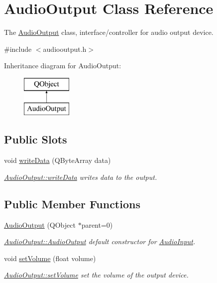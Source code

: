\hypertarget{class_audio_output}{\section{Audio\+Output Class Reference}
\label{class_audio_output}
}


The \hyperlink{class_audio_output}{Audio\+Output} class, interface/controller for audio output device.  




{\ttfamily \#include $<$audiooutput.\+h$>$}

Inheritance diagram for Audio\+Output\+:\begin{figure}[H]
\begin{center}
\leavevmode
\includegraphics[height=2.000000cm]{class_audio_output}
\end{center}
\end{figure}
\subsection*{Public Slots}
\begin{DoxyCompactItemize}
\item 
void \hyperlink{class_audio_output_a7daeee7334313b255eac6b2d31e54729}{write\+Data} (Q\+Byte\+Array data)
\begin{DoxyCompactList}\small\item\em \hyperlink{class_audio_output_a7daeee7334313b255eac6b2d31e54729}{Audio\+Output\+::write\+Data} writes data to the output. \end{DoxyCompactList}\end{DoxyCompactItemize}
\subsection*{Public Member Functions}
\begin{DoxyCompactItemize}
\item 
\hyperlink{class_audio_output_a1536f8f50eb732249ffbcf491b04dee2}{Audio\+Output} (Q\+Object $\ast$parent=0)
\begin{DoxyCompactList}\small\item\em \hyperlink{class_audio_output_a1536f8f50eb732249ffbcf491b04dee2}{Audio\+Output\+::\+Audio\+Output} default constructor for \hyperlink{class_audio_input}{Audio\+Input}. \end{DoxyCompactList}\item 
void \hyperlink{class_audio_output_a97008d6a17c3dc03c64e421f563e04b8}{set\+Volume} (float volume)
\begin{DoxyCompactList}\small\item\em \hyperlink{class_audio_output_a97008d6a17c3dc03c64e421f563e04b8}{Audio\+Output\+::set\+Volume} set the volume of the output device. \end{DoxyCompactList}\end{DoxyCompactItemize}
